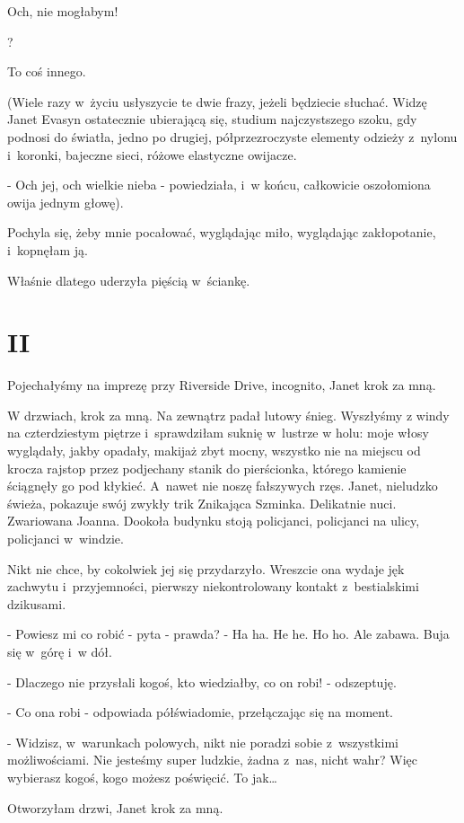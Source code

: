 \documentclass[oneside,polish,12pt,sfheadings]{mwbk}
\begin{document}
Och, nie mogłabym!

?

To coś innego.

(Wiele razy w~życiu usłyszycie te dwie frazy, jeżeli będziecie słuchać.
Widzę Janet Evasyn ostatecznie ubierającą się, studium najczystszego
szoku, gdy podnosi do światła, jedno po drugiej, półprzezroczyste
elementy odzieży z~nylonu i~koronki, bajeczne sieci, różowe elastyczne
owijacze. 

- Och jej, och wielkie nieba - powiedziała, i~w końcu, całkowicie oszołomiona
owija jednym głowę).

Pochyla się, żeby mnie pocałować, wyglądając miło, wyglądając zakłopotanie,
i~kopnęłam ją.

Właśnie dlatego uderzyła pięścią w~ściankę.

\chapter{II}

Pojechałyśmy na imprezę przy Riverside Drive, incognito, Janet krok
za mną.

W drzwiach, krok za mną. Na zewnątrz padał lutowy śnieg. Wyszłyśmy
z windy na czterdziestym piętrze i~sprawdziłam suknię w~lustrze w
holu: moje włosy wyglądały, jakby opadały, makijaż zbyt mocny, wszystko
nie na miejscu od krocza rajstop przez podjechany stanik do pierścionka,
którego kamienie ściągnęły go pod kłykieć. A~nawet nie noszę fałszywych
rzęs. Janet, nieludzko świeża, pokazuje swój zwykły trik Znikająca
Szminka. Delikatnie nuci. Zwariowana Joanna. Dookoła budynku stoją
policjanci, policjanci na ulicy, policjanci w~windzie.

Nikt nie chce, by cokolwiek jej się przydarzyło. Wreszcie ona wydaje
jęk zachwytu i~przyjemności, pierwszy niekontrolowany kontakt z~bestialskimi
dzikusami.

- Powiesz mi co robić - pyta - prawda? - Ha ha. He he. Ho ho. Ale zabawa.
Buja się w~górę i~w dół.

- Dlaczego nie przysłali kogoś, kto wiedziałby, co on robi! - odszeptuję.

- Co ona robi - odpowiada półświadomie, przełączając się na moment.

- Widzisz, w~warunkach polowych, nikt nie poradzi sobie z~wszystkimi
możliwościami. Nie jesteśmy super ludzkie, żadna z~nas, nicht wahr?
Więc wybierasz kogoś, kogo możesz poświęcić. To jak\ldots

Otworzyłam drzwi, Janet krok za mną.
\end{document}
